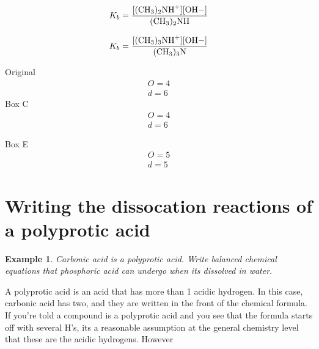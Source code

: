 \documentclass{article}  %
\newtheorem{exmp}{Example}
\begin{document}
\begin{equation*}
    \begin{aligned}
        K_b = \ce{\frac{[(CH3)2NH^+][OH-]}{(CH3)2NH}}
    \end{aligned}
\end{equation*}

\begin{equation*}
    \begin{aligned}
        K_b = \ce{\frac{[(CH3)3NH+][OH-]}{(CH3)3N}}
    \end{aligned}
\end{equation*}

Original
\begin{equation*}
    \begin{aligned}
        O = 4 \\
        d = 6 
    \end{aligned}
\end{equation*}
Box C
\begin{equation*}
    \begin{aligned}
        O = 4 \\
        d = 6 
    \end{aligned}
\end{equation*}

Box E
\begin{equation*}
    \begin{aligned}
        O = 5 \\
        d = 5 
    \end{aligned}
\end{equation*}

\section*{Writing the dissocation reactions of a polyprotic acid}
\begin{exmp}
    Carbonic acid  is a polyprotic acid. Write balanced chemical equations that phosphoric acid can undergo when its dissolved in water. 
\end{exmp}
A polyprotic acid is an acid that has more than 1 acidic hydrogen. In this case, carbonic acid has two, and they are written in the front of the chemical formula.
\newline
If you're told a compound is a polyprotic acid and you see that the formula starts off with several H's, its a reasonable assumption at the general chemistry level that these are the acidic hydrogens.
\newline
However 
\end{document}
